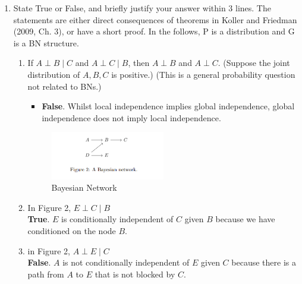 \documentclass[a3paper,12pt]{extarticle} %
\begin{document}
\begin{enumerate}
\item  State True or False, and briefly justify your answer within 3 lines. The statements are either
direct consequences of theorems in Koller and Friedman (2009, Ch. 3), or have a short proof. In the
follows, P is a distribution and G is a BN structure.
\begin{enumerate}
    \item If \( A \perp B \mid C \) and \( A \perp C \mid B \), then \( A \perp B \) and \( A \perp C \). (Suppose the joint distribution of \( A, B, C \) is positive.) (This is a general probability question not related to BNs.)
    \begin{itemize}
        \item \textbf{False}. Whilst local independence implies global independence, global independence does not imply local independence.
    \end{itemize}
    \begin{figure}[h]
        \centering
        \includegraphics[width=0.5\textwidth]{bn2.png}
        \caption{Bayesian Network}
    \end{figure}
    \item In Figure 2, \(E \perp C \mid B\)
    \\ \textbf{True}. \(E\) is conditionally independent of \(C\) given \(B\) because we have conditioned on the node \(B\).
    \item in Figure 2, \(A \perp E \mid C\)
    \\ \textbf{False}. \(A\) is not conditionally independent of \(E\) given \(C\) because there is a path from \(A\) to \(E\) that is not blocked by \(C\).

\end{enumerate}
\end{enumerate}
\end{document}
